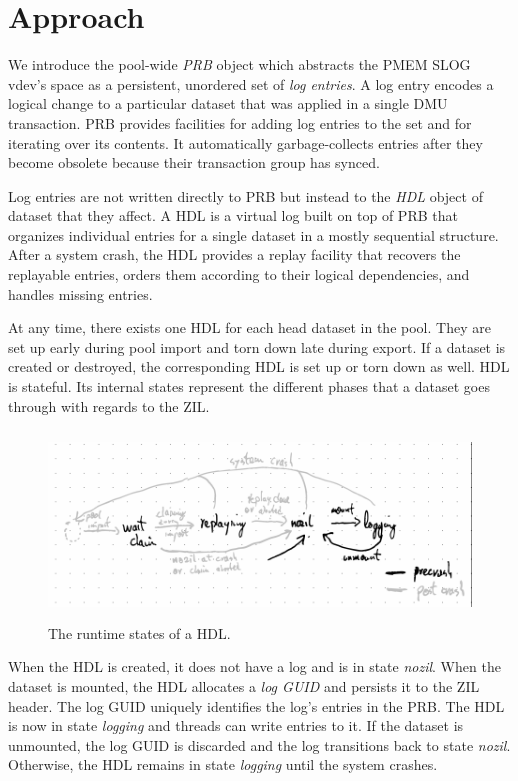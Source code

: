 \documentclass[12pt,a4paper,twoside]{book}
\begin{document}
\section{Approach}\label{di:prb:approach}
We introduce the pool-wide \textit{PRB} object which abstracts the PMEM SLOG vdev's space as a persistent, unordered set of \textit{log entries}.
A log entry encodes a logical change to a particular dataset that was applied in a single DMU transaction.
PRB provides facilities for adding log entries to the set and for iterating over its contents.
It automatically garbage-collects entries after they become obsolete because their transaction group has synced.

Log entries are not written directly to PRB but instead to the \textit{HDL} object of dataset that they affect.
A HDL is a virtual log built on top of PRB that organizes individual entries for a single dataset in a mostly sequential structure.
After a system crash, the HDL provides a replay facility that recovers the replayable entries, orders them according to their logical dependencies, and handles missing entries.

At any time, there exists one HDL for each head dataset in the pool.
They are set up early during pool import and torn down late during export.
If a dataset is created or destroyed, the corresponding HDL is set up or torn down as well.
HDL is stateful.
Its internal states represent the different phases that a dataset goes through with regards to the ZIL.

\begin{figure}[H]
    \centering
    \includegraphics[height=5cm]{fig/prb_hdl_runtime_states}
    \caption{The runtime states of a HDL.}
\end{figure}

When the HDL is created, it does not have a log and is in state \textit{nozil}.
When the dataset is mounted, the HDL allocates a \textit{log GUID} and persists it to the ZIL header.
The log GUID uniquely identifies the log's entries in the PRB.
The HDL is now in state \textit{logging} and threads can write entries to it.
If the dataset is unmounted, the log GUID is discarded and the log transitions back to state \textit{nozil}.
Otherwise, the HDL remains in state \textit{logging} until the system crashes.
\end{document}
